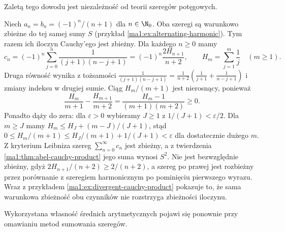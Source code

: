 Zaletą tego dowodu jest niezależność od teorii szeregów potęgowych.

\begin{przyklad}
\label{ma1:ex:convergent-conditional-product}
Niech $a_n=b_n=(-1)^n/(n+1)$ dla $n\in\N_0$. Oba szeregi są warunkowo zbieżne do tej samej sumy $S$ (przykład \ref{ma1:ex:alternating-harmonic}). Tym razem ich iloczyn Cauchy'ego jest zbieżny. Dla każdego $n\ge0$ mamy
\[
 c_n=(-1)^n\sum_{j=0}^n\frac1{(j+1)(n-j+1)}
     =(-1)^n\frac{2H_{n+1}}{n+2},
 \qquad H_m=\sum_{j=1}^m\frac1j\quad(m\ge1).
\]
Druga równość wynika z tożsamości
$\frac1{(j+1)(n-j+1)}=\frac1{n+2}(\frac1{j+1}+\frac1{n-j+1})$ i zmiany indeksu w drugiej sumie.
Ciąg $H_m/(m+1)$ jest nierosnący, ponieważ
\[
 \frac{H_m}{m+1}-\frac{H_{m+1}}{m+2}
 =\frac{H_m-1}{(m+1)(m+2)}\ge0.
\]
Ponadto dąży do zera: dla $\varepsilon>0$ wybieramy $J\ge1$ z $1/(J+1)<\varepsilon/2$. Dla $m\ge J$ mamy $H_m\le H_J+(m-J)/(J+1)$, stąd $0\le H_m/(m+1)\le H_J/(m+1)+1/(J+1)<\varepsilon$ dla dostatecznie dużego $m$.
Z kryterium Leibniza szereg $\sum_{n=0}^\infty c_n$ jest zbieżny, a z twierdzenia \ref{ma1:thm:abel-cauchy-product} jego suma wynosi $S^2$. Nie jest bezwzględnie zbieżny, gdyż $2H_{n+1}/(n+2)\ge2/(n+2)$, a szereg po prawej jest rozbieżny przez porównanie z szeregiem harmonicznym po pominięciu pierwszego wyrazu. Wraz z przykładem \ref{ma1:ex:divergent-cauchy-product} pokazuje to, że sama warunkowa zbieżność obu czynników nie rozstrzyga zbieżności iloczynu.
\end{przyklad}
 Wykorzystana własność średnich arytmetycznych pojawi się ponownie przy omawianiu metod sumowania szeregów.

